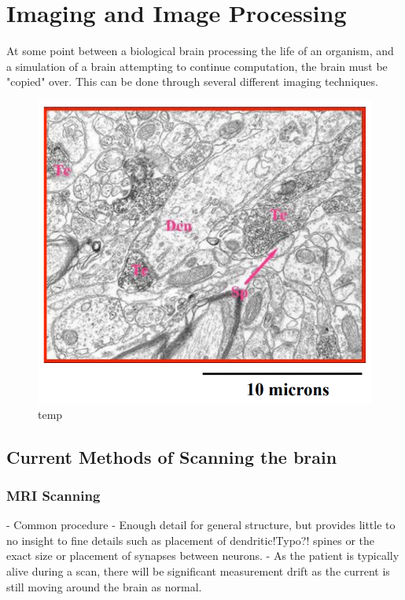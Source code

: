 \section{Imaging and Image Processing}
At some point between a biological brain processing the life of an organism, and
a simulation of a brain attempting to continue computation, the brain must be
"copied" over. This can be done through several different imaging techniques.

\begin{figure}[h]
    \centering
    \includegraphics{figures/graphs/scaleexample.png}
    {temp}
    \label{scaleexample}
\end{figure}
\vspace{1ex}

\subsection{Current Methods of Scanning the brain}

\subsubsection*{MRI Scanning}

- Common procedure
- Enough detail for general structure, but provides little to no insight to fine
details such as placement of dendritic!Typo?! spines or the exact size or placement of
synapses between neurons.
- As the patient is typically alive during a scan, there will be significant
measurement drift as the current is still moving around the brain as normal.

